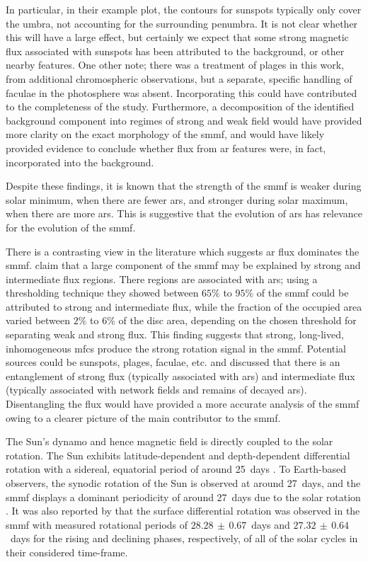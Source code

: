 In particular, in their example plot, the contours for sunspots typically only cover the umbra, not accounting for the surrounding penumbra. It is not clear whether this will have a large effect, but certainly we expect that some strong magnetic flux associated with sunspots has been attributed to the background, or other nearby features. One other note; there was a treatment of plages in this work, from additional chromospheric observations, but a separate, specific handling of faculae in the photosphere was absent. Incorporating this could have contributed to the completeness of the study. Furthermore, a decomposition of the identified background component into regimes of strong and weak field would have provided more clarity on the exact morphology of the \gls{smmf}, and would have likely provided evidence to conclude whether flux from \gls{ar} features were, in fact, incorporated into the background.

Despite these findings, it is known that the strength of the \gls{smmf} is weaker during solar minimum, when there are fewer \glspl{ar}, and stronger during solar maximum, when there are more \glspl{ar}. This is suggestive that the evolution of \glspl{ar} has relevance for the evolution of the \gls{smmf}.

There is a contrasting view in the literature which suggests \gls{ar} flux dominates the \gls{smmf}. \citet{kutsenko_contribution_2017} claim that a large component of the \gls{smmf} may be explained by strong and intermediate flux regions. There regions are associated with \glspl{ar}; using a thresholding technique they showed between $65 \%$ to $95 \%$ of the \gls{smmf} could be attributed to strong and intermediate flux, while the fraction of the occupied area varied between $2 \%$ to $6 \%$ of the disc area, depending on the chosen threshold for separating weak and strong flux. This finding suggests that strong, long-lived, inhomogeneous \gls{mfc}s produce the strong rotation signal in the \gls{smmf}. Potential sources could be sunspots, plages, faculae, etc. and \citet{kutsenko_contribution_2017} discussed that there is an entanglement of strong flux (typically associated with \glspl{ar}) and intermediate flux (typically associated with network fields and remains of decayed \glspl{ar}). Disentangling the flux would have provided a more accurate analysis of the \gls{smmf} owing to a clearer picture of the main contributor to the \gls{smmf}.

The Sun's dynamo and hence magnetic field is directly coupled to the solar rotation. The Sun exhibits latitude-dependent and depth-dependent differential rotation with a sidereal, equatorial period of around 25~days \citep{howe_solar_2009}. To Earth-based observers, the synodic rotation of the Sun is observed at around 27~days, and the \gls{smmf} displays a dominant periodicity of around 27~days due to the solar rotation \citep{chaplin_studies_2003, xie_temporal_2017, bose_variability_2018}. It was also reported by \citet{xie_temporal_2017} that the surface differential rotation was observed in the \gls{smmf} with measured rotational periods of $28.28 \, \pm \, 0.67$~days and $27.32 \, \pm \, 0.64$~days for the rising and declining phases, respectively, of all of the solar cycles in their considered time-frame.

